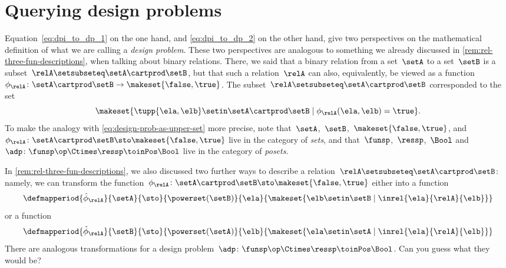 
\section{Querying design problems}
\label{sec:dp-querying}



Equation~\cref{eq:dpi_to_dp_1} on the one hand, and \cref{eq:dpi_to_dp_2} on the other hand, give two perspectives on the mathematical definition of what we are calling a \emph{design problem}.
These two perspectives are analogous to something we already discussed in \cref{rem:rel-three-fun-descriptions}, when talking about binary relations.
There, we said that a binary relation from a set~$\setA$ to a set~$\setB$ is a subset~$\relA \setsubseteq \setA \cartprod \setB$,
but that such a relation~$\relA$ can also, equivalently, be viewed as a function~$\phi_{\relA}\colon \setA \cartprod\setB \to \makeset{ \false, \true }$.
The subset~$\relA \setsubseteq \setA \cartprod \setB$ corresponded to the set
\begin{equation}
    \makeset{ \tupp{\ela, \elb} \setin \setA \cartprod \setB \mid \phi_{\relA}(\ela, \elb) = \true }.
\end{equation}
%
To make the analogy with \cref{eq:design-prob-as-upper-set} more precise, note that~$\setA$,~$\setB$,~$\makeset{ \false, \true }$, and~$\phi_{\relA}\colon \setA \cartprod\setB \sto \makeset{ \false, \true }$ live in the category of \emph{sets}, and that~$\funsp$,~$\ressp$,~$\Bool$ and~$\adp\colon \funsp\op \Ctimes \ressp\toinPos \Bool$ live in the category of \emph{posets}.

In \cref{rem:rel-three-fun-descriptions}, we also discussed two further ways to describe a relation~$\relA \setsubseteq \setA \cartprod \setB$: namely, we can transform the function~$\phi_{\relA}\colon \setA \cartprod\setB \sto \makeset{ \false, \true }$ either into a function
\begin{equation}
    \label{eq:curried-relation-again}
    \defmapperiod{
        \hat \phi_{\relA}}{\setA}{\sto
    }{
        \powerset(\setB)
    }{
        \ela
    }{
        \makeset{ \elb \setin \setB \mid \inrel{\ela
            }{
                \relA
            }{
                \elb} }
    }
\end{equation}
or a function
\begin{equation}
    \label{eq:co-curried-relation-again}
    \defmapperiod{
        \check \phi_{\relA}}{\setB}{\sto
    }{
        \powerset (\setA)
    }{
        \elb
    }{
        \makeset{ \ela \setin \setA \mid \inrel{\ela
            }{
                \relA
            }{
                \elb}}
    }
\end{equation}
%
There are analogous transformations for a design problem~$\adp\colon \funsp\op \Ctimes \ressp\toinPos \Bool$.
Can you guess what they would be?

